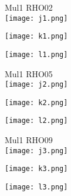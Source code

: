\documentclass[a4paper]{article}
\begin{document}
    \begin{figure}[tb]
    Mul1 RHO02 \\
    \texttt{[image: j1.png]}
        \begin{minipage}{0.48\textwidth}
            \def\svgwidth{\columnwidth}
            \texttt{[image: k1.png]}
        \end{minipage}
        \hspace{4em}
        \begin{minipage}{0.48\textwidth}
            \def\svgwidth{\columnwidth}
            \texttt{[image: l1.png]}
        \end{minipage}
    \end{figure}
    \newpage
    \begin{figure}[tb]
    Mul1 RHO05 \\
    \texttt{[image: j2.png]}
        \begin{minipage}{0.48\textwidth}
            \def\svgwidth{\columnwidth}
            \texttt{[image: k2.png]}
        \end{minipage}
        \hspace{4em}
        \begin{minipage}{0.48\textwidth}
            \def\svgwidth{\columnwidth}
            \texttt{[image: l2.png]}
        \end{minipage}
    \end{figure}
    \newpage
    
    \begin{figure}[tb]
        Mul1 RHO09 \\
    \texttt{[image: j3.png]}
        \begin{minipage}{0.48\textwidth}
            \def\svgwidth{\columnwidth}
            \texttt{[image: k3.png]}
        \end{minipage}
        \hspace{4em}
        \begin{minipage}{0.48\textwidth}
            \def\svgwidth{\columnwidth}
            \texttt{[image: l3.png]}
        \end{minipage}
    \end{figure}
    
\end{document}
